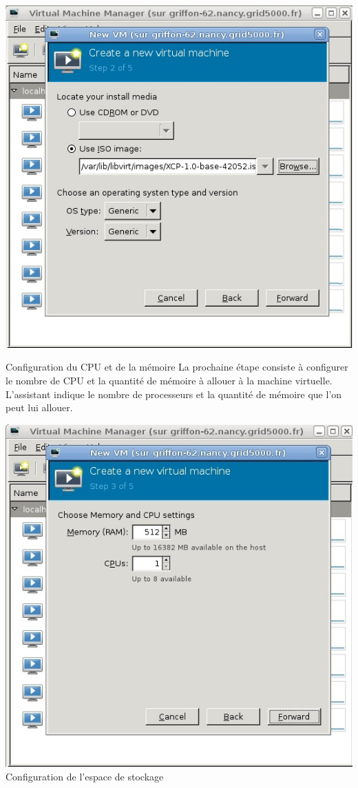 \includegraphics{images/iso.jpg}


Configuration du CPU et de la mémoire
La prochaine étape consiste à configurer le nombre de CPU et la quantité de mémoire à allouer à la machine virtuelle. L'assistant indique le nombre de processeurs et la quantité de mémoire que l'on peut lui allouer.

\includegraphics{images/cpu.jpg}
Configuration de l'espace de stockage

